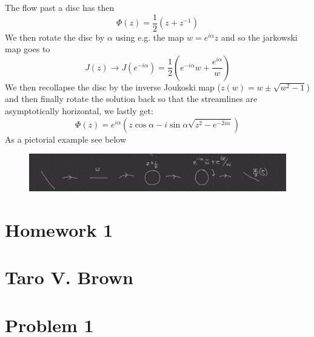 \documentclass[a4paper,12pt]{article}
\begin{document}
The flow past a disc has then
\begin{equation}
\Phi(z)=\frac{1}{2}\left(z+z^{-1}\right)
\end{equation}
 We then rotate the disc by $\alpha$ using e.g. the map $w=e^{i\alpha}z$
 and so the jarkowski map goes to
 \begin{equation}
J(z)\to J(e^{-i\alpha})=\frac{1}{2}\left(e^{-i\alpha}w+\frac{e^{i\alpha}}{w}\right)
 \end{equation}
We then recollapse the disc by the inverse Joukoski map ($z(w)=w\pm\sqrt{w^2-1}$) and then finally rotate the solution back so that the streamlines are asymptotically horizontal, we lastly get:
\begin{equation}
\Phi(z)=e^{i\alpha}\left(z\cos \alpha -i\sin \alpha \sqrt{z^2-e^{-2i\alpha}}\right)
\end{equation}
As a pictorial example see below
\begin{figure}[H]
	\centering
	\includegraphics[width=0.9\linewidth]{11}
	\caption{}
	\label{fig:4}
\end{figure}
\newpage
\section*{Homework 1\\\\
Taro V. Brown}\vspace*{1cm}
\section*{Problem 1}
\end{document}
